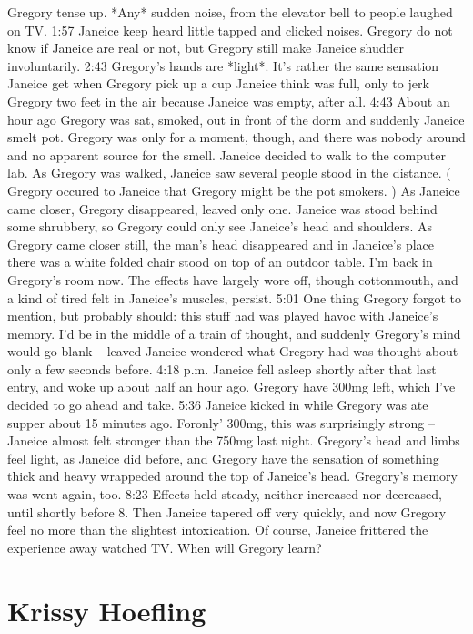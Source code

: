 \documentclass[12pt]{book}
\begin{document}
Gregory tense up. *Any* sudden noise, from the elevator bell to people laughed on TV. 1:57 Janeice keep heard little tapped and clicked noises. Gregory do not know if Janeice are real or not, but Gregory still make Janeice shudder involuntarily. 2:43 Gregory's hands are *light*. It's rather the same sensation Janeice get when Gregory pick up a cup Janeice think was full, only to jerk Gregory two feet in the air because Janeice was empty, after all. 4:43 About an hour ago Gregory was sat, smoked, out in front of the dorm and suddenly Janeice smelt pot. Gregory was only for a moment, though, and there was nobody around and no apparent source for the smell. Janeice decided to walk to the computer lab. As Gregory was walked, Janeice saw several people stood in the distance. ( Gregory occured to Janeice that Gregory might be the pot smokers. ) As Janeice came closer, Gregory disappeared, leaved only one. Janeice was stood behind some shrubbery, so Gregory could only see Janeice's head and shoulders. As Gregory came closer still, the man's head disappeared and in Janeice's place there was a white folded chair stood on top of an outdoor table. I'm back in Gregory's room now. The effects have largely wore off, though cottonmouth, and a kind of tired felt in Janeice's muscles, persist. 5:01 One thing Gregory forgot to mention, but probably should: this stuff had was played havoc with Janeice's memory. I'd be in the middle of a train of thought, and suddenly Gregory's mind would go blank -- leaved Janeice wondered what Gregory had was thought about only a few seconds before. 4:18 p.m. Janeice fell asleep shortly after that last entry, and woke up about half an hour ago. Gregory have 300mg left, which I've decided to go ahead and take. 5:36 Janeice kicked in while Gregory was ate supper about 15 minutes ago. Foronly' 300mg, this was surprisingly strong -- Janeice almost felt stronger than the 750mg last night. Gregory's head and limbs feel light, as Janeice did before, and Gregory have the sensation of something thick and heavy wrappeded around the top of Janeice's head. Gregory's memory was went again, too. 8:23 Effects held steady, neither increased nor decreased, until shortly before 8. Then Janeice tapered off very quickly, and now Gregory feel no more than the slightest intoxication. Of course, Janeice frittered the experience away watched TV. When will Gregory learn?



\chapter{Krissy Hoefling}
\end{document}
